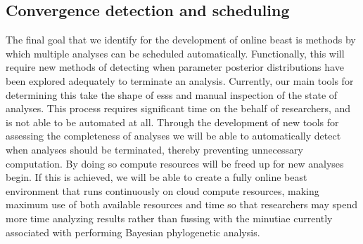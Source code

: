 \subsection{Convergence detection and scheduling}

The final goal that we identify for the development of online \gls{beast} is methods by which multiple analyses can be scheduled automatically.
Functionally, this will require new methods of detecting when parameter posterior distributions have been explored adequately to terminate an analysis.
Currently, our main tools for determining this take the shape of \gls{ess}s and manual inspection of the state of analyses.
This process requires significant time on the behalf of researchers, and is not able to be automated at all.
Through the development of new tools for assessing the completeness of analyses we will be able to automatically detect when analyses should be terminated, thereby preventing unnecessary computation.
By doing so compute resources will be freed up for new analyses begin.
If this is achieved, we will be able to create a fully online \gls{beast} environment that runs continuously on cloud compute resources, making maximum use of both available resources and time so that researchers may spend more time analyzing results rather than fussing with the minutiae currently associated with performing Bayesian phylogenetic analysis.


\cleardoublepage

